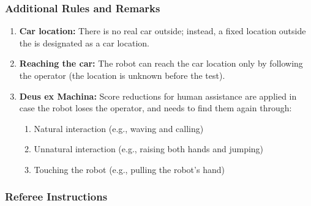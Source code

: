 \subsubsection*{Additional Rules and Remarks}
\begin{enumerate}[nosep]

	\item \textbf{Car location:} There is no real car outside; instead, a fixed location outside the \Arena{} is designated as a car location.

	\item \textbf{Reaching the car:} The robot can reach the car location only by following the operator (the location is unknown before the test).

	\item \textbf{Deus ex Machina:} Score reductions for human assistance are applied in case the robot loses the operator, and needs to find them again through:
    \begin{enumerate}
     \item Natural interaction (e.g., waving and calling)
     \item Unnatural interaction (e.g., raising both hands and jumping)
     \item Touching the robot (e.g., pulling the robot's hand)
    \end{enumerate}
\end{enumerate}


\subsubsection*{Referee Instructions}

